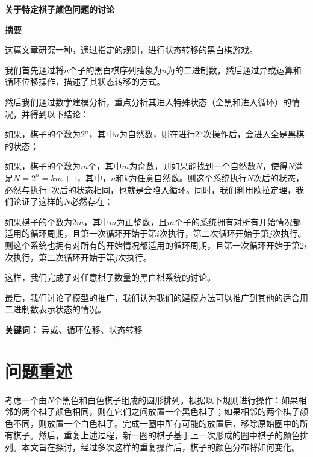 \documentclass[12pt,AutoFakeSlant,AutoFakeBold]{article}
\begin{document}
\centerline{\Large\heiti\textbf{关于特定棋子颜色问题的讨论}}

\vspace{0.3cm}

\centerline{\large\heiti\textbf{摘要}}

这篇文章研究一种，通过指定的规则，进行状态转移的黑白棋游戏。

我们首先通过将$n$个子的黑白棋序列抽象为$n$为的二进制数，然后通过异或运算和循环位移操作，描述了其状态转移的方式。

然后我们通过数学建模分析，重点分析其进入特殊状态（全黑和进入循环）的情况，并得到以下结论：

\begin{enumerate*}
    \item 如果，棋子的个数为$2^n$，其中$n$为自然数，则在进行$2^n$次操作后，会进入全是黑棋的状态；
    \item 如果，棋子的个数为$m$个，其中$m$为奇数，则如果能找到一个自然数$N$，使得$N$满足$N=2^n=km+1$，其中，$n$和$k$为任意自然数。则这个系统执行$N$次后的状态，必然与执行$1$次后的状态相同，也就是会陷入循环。同时，我们利用欧拉定理，我们论证了这样的$N$必然存在；
    \item 如果棋子的个数为$2m$，其中$m$为正整数，且$m$个子的系统拥有对所有开始情况都适用的循环周期，且第一次循环开始于第$i$次执行，第二次循环开始于第$j$次执行。则这个系统也拥有对所有的开始情况都适用的循环周期，且第一次循环开始于第$2i$次执行，第二次循环开始于第$j$次执行。
\end{enumerate*}

这样，我们完成了对任意棋子数量的黑白棋系统的讨论。

最后，我们讨论了模型的推广，我们认为我们的建模方法可以推广到其他的适合用二进制数表示状态的情况。

\textbf{关键词：} 异或、循环位移、状态转移


\newpage

\section{问题重述}

考虑一个由$N$个黑色和白色棋子组成的圆形排列。根据以下规则进行操作：如果相邻的两个棋子颜色相同，则在它们之间放置一个黑色棋子；如果相邻的两个棋子颜色不同，则放置一个白色棋子。完成一圈中所有可能的放置后，移除原始圈中的所有棋子。然后，重复上述过程，新一圈的棋子基于上一次形成的圈中棋子的颜色排列。本文旨在探讨，经过多次这样的重复操作后，棋子的颜色分布将如何变化。
\end{document}
